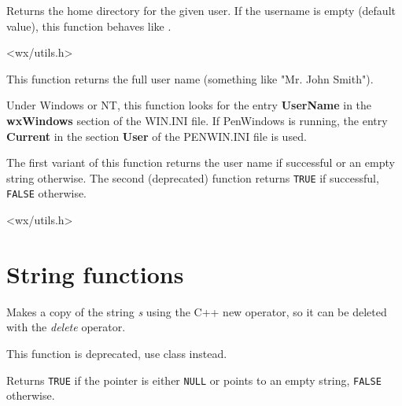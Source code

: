 Returns the home directory for the given user. If the username is empty
(default value), this function behaves like 
.


<wx/utils.h>

\label{wxgetusername}



This function returns the full user name (something like "Mr. John Smith").

Under Windows or NT, this function looks for the entry {\bf UserName}\rtfsp
in the {\bf wxWindows} section of the WIN.INI file. If PenWindows
is running, the entry {\bf Current} in the section {\bf User} of
the PENWIN.INI file is used.

The first variant of this function returns the user name if successful or an
empty string otherwise. The second (deprecated) function returns {\tt TRUE}
if successful, {\tt FALSE} otherwise.




<wx/utils.h>

\section{String functions}

\label{copystring}


Makes a copy of the string {\it s} using the C++ new operator, so it can be
deleted with the {\it delete} operator.

This function is deprecated, use  class instead.

\label{wxisempty}


Returns {\tt TRUE} if the pointer is either {\tt NULL} or points to an empty
string, {\tt FALSE} otherwise.

\label{wxstricmp}


